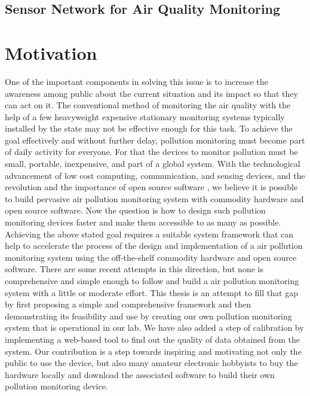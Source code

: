 \subsection{Sensor Network for Air Quality Monitoring}







\section{Motivation}

One of the important components in solving this issue is to increase the awareness among public about the current situation and its impact so that they can act on it. The conventional method of monitoring the air quality with the help of a few heavyweight expensive stationary monitoring systems typically installed by the state may not be effective enough for this task. To achieve the goal effectively and without further delay, pollution monitoring must become part of daily activity for everyone. For that the devices to monitor pollution must be small, portable, inexpensive, and part of a global system. With the technological advancement of low cost computing, communication, and sensing devices, and the revolution and the importance of open source software \cite{Anthes2016}, we believe it is possible to build pervasive air pollution monitoring system with commodity hardware and open source software. Now the question is how to design such pollution monitoring devices faster and make them accessible to as many as possible. 
\\
Achieving the above stated goal requires a suitable system framework that can help to accelerate the process of the design and implementation of a air pollution monitoring system using the off-the-shelf commodity hardware and open source software. There are some recent attempts in this direction, but none is comprehensive and simple enough to follow and build a air pollution monitoring system with a little or moderate effort. This thesis is an attempt to fill that gap by first proposing a simple and comprehensive framework and then demonstrating its feasibility and use by creating our own pollution monitoring system that is operational in our lab. We have also added a step of calibration by implementing a web-based tool to find out the quality of data obtained from the system. Our contribution is a step towards inspiring and motivating not only the public to use the device, but also many amateur electronic hobbyists to buy the hardware locally and download the associated software to build their own pollution monitoring device.


